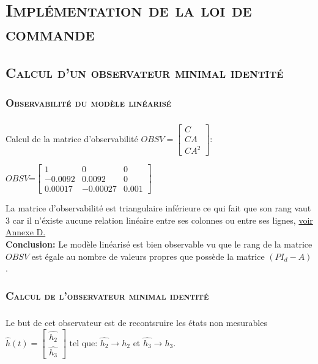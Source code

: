 \chapter{\textsc {Implémentation de la loi de commande} }

	\section{\textsc {Calcul d'un observateur minimal identité}} 
	 \subsection{\textsc {Observabilité du modèle linéarisé}} 
	 
	 \paragraph{}
 		Calcul de la matrice d'observabilité $OBSV=\begin{bmatrix} C\\CA\\CA^{2} \end{bmatrix} $:
 		
 		\begin{center}
			
			$OBSV$=$\begin{bmatrix}
			1&0&0\\
			-0.0092&0.0092&0\\
			0.00017&-0.00027&0.001
			\end{bmatrix}$	
					 			
		\end{center} 		
				
		La matrice d'observabilité est triangulaire inférieure ce qui fait que son rang vaut 3 car il n'éxiste aucune relation linéaire entre ses colonnes ou entre ses lignes,\label{OBSV} \hyperref[Annexe D]{voir Annexe D.}\\
		
		\textbf{Conclusion:} Le modèle linéarisé est bien observable vu que le rang de la matrice $OBSV$ est égale au nombre de valeurs propres que possède la matrice $(PI_d-A)$. 
		
	 \subsection{\textsc {Calcul de l'observateur minimal identité}}
	 
	 \paragraph{} Le but de cet observateur est de recontsruire les états non mesurables\\
	  $\widehat{h}(t)=\begin{bmatrix} \widehat{h_2}\\ \widehat{h_3} \end{bmatrix}$ tel que: $\widehat{h_2}\rightarrow h_2$ et $\widehat{h_3}\rightarrow h_3$.\\ 
	 
